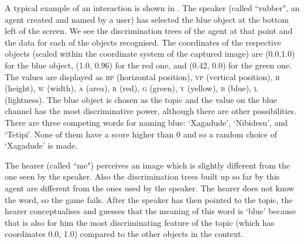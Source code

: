 A typical example of an interaction is shown in . 
The speaker (called ``rubber", an agent created and named by a user) has selected the blue object at the bottom left 
of the screen. We see the discrimination trees of the agent at that point and the data for each of the objects 
recognised. The coordinates of the respective objects (scaled within the coordinate system of 
the captured image) are (0.0,1.0) for the blue object, (1.0, 0.96) for the red one, and (0.42, 0.0) for the green one. 
The values are displayed as \textsc{hp} (horizontal position), \textsc{vp} (vertical position), \textsc{h} (height), \textsc{w} (width), \textsc{a} (area), 
\textsc{r} (red), \textsc{g} (green), \textsc{y} (yellow), \textsc{b} (blue), \textsc{l} (lightness). 
The blue object is chosen as the topic and the value on the blue channel has the most discriminative power, although 
there are other possibilities. There are three competing words for naming blue: `Xagadude', `Nibidesu', and `Tetipi'. 
None of them have a score higher than 0 and so a random choice of `Xagadude' is made. 

The hearer (called ``me") perceives an image which is slightly different from 
the one seen by the speaker. Also the discrimination trees built up so far by this agent are different from the ones used
by the speaker. The hearer does not know the word, so the game fails. After the speaker has then pointed to the 
topic, the hearer conceptualises and guesses that the meaning of this word is `blue' because that is also for him the most 
discriminating feature of the topic (which has coordinates 0.0, 1.0) compared to the other objects in the context. 


